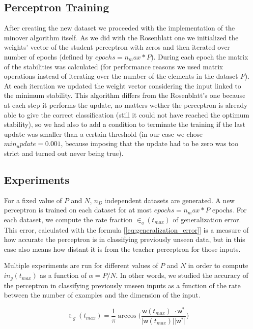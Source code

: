 \subsection{Perceptron Training}
After creating the new dataset we proceeded with the implementation of the minover algorithm itself. As we did with the Rosenblatt one
we initialized the weights' vector of the student perceptron with zeros and then iterated over number of epochs (defined by $epochs = n_max * P$).
During each epoch the matrix of the stabilities was calculated (for performance reasons we used matrix operations instead of iterating over the
number of the elements in the dataset $P$). At each iteration we updated the weight vector considering the input linked to the minimum stability.
This algorithm differs from the Rosenblatt's one because at each step it performs the update, no matters wether the perceptron is already able to give
the correct classification (still it could not have reached the optimum stability), so we had also to add a condition to terminate the training if the
last update was smaller than a certain threshold (in our case we chose $min_update = 0.001$, because imposing that the update had to be zero was too
strict and turned out never being true).

\subsection{Experiments}
For a fixed value of $P$ and $N$, $n_D$ independent datasets are generated. A new perceptron is trained on each dataset for at most $epochs = n_max * P$ epochs.
For each dataset, we compute the rate fraction $\in_g(t_{max})$ of generalization error. This error, calculated with the formula [\ref{eq:generalization_error}]
is a measure of how accurate the perceptron is in classifying previously unseen data, but in this case also means how distant it is from the teacher perceptron for those inputs.

Multiple experiments are run for different values of $P$ and $N$ in order to compute $in_g(t_{max})$ as a function of $\alpha = P / N$.
In other words, we studied the accuracy of the perceptron in classifying previously unseen inputs as a function of the rate between the number of examples and the dimension of the input.


\begin{equation} \label{eq:generalization_error}
    \in_g(t_{max}) = \frac{1}{\pi} \arccos \bigg(\frac{\bm{\mathsf{w}}(t_{max})\;\cdotp \bm{\mathsf{w}}^*}{\lvert \bm{\mathsf{w}}(t_{max}) \rvert \lvert \bm{\mathsf{w}}^* \rvert} \bigg)
\end{equation}

